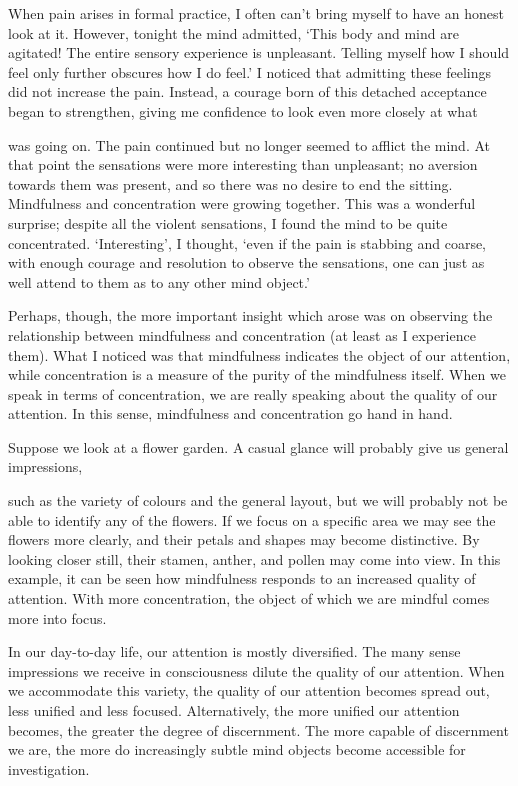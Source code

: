 When pain arises in formal practice, I often can't bring myself to have
an honest look at it. However, tonight the mind admitted, `This body and
mind are agitated! The entire sensory experience is unpleasant. Telling
myself how I should feel only further obscures how I do feel.' I noticed
that admitting these feelings did not increase the pain. Instead, a
courage born of this detached acceptance began to strengthen, giving me
confidence to look even more closely at what

was going on. The pain continued but no longer seemed to afflict the
mind. At that point the sensations were more interesting than
unpleasant; no aversion towards them was present, and so there was no
desire to end the sitting. Mindfulness and concentration were growing
together. This was a wonderful surprise; despite all the violent
sensations, I found the mind to be quite concentrated. `Interesting', I
thought, `even if the pain is stabbing and coarse, with enough courage
and resolution to observe the sensations, one can just as well attend to
them as to any other mind object.'

Perhaps, though, the more important insight which arose was on observing
the relationship between mindfulness and concentration (at least as I
experience them). What I noticed was that mindfulness indicates the
object of our attention, while concentration is a measure of the purity
of the mindfulness itself. When we speak in terms of concentration, we
are really speaking about the quality of our attention. In this sense, 
mindfulness and concentration go hand in hand. 

Suppose we look at a flower garden. A casual glance will probably give
us general impressions, 

such as the variety of colours and the general layout, but we will
probably not be able to identify any of the flowers. If we focus on a
specific area we may see the flowers more clearly, and their petals and
shapes may become distinctive. By looking closer still, their stamen, 
anther, and pollen may come into view. In this example, it can be seen
how mindfulness responds to an increased quality of attention. With more
concentration, the object of which we are mindful comes more into focus. 

In our day-to-day life, our attention is mostly diversified. The many
sense impressions we receive in consciousness dilute the quality of our
attention. When we accommodate this variety, the quality of our
attention becomes spread out, less unified and less focused. 
Alternatively, the more unified our attention becomes, the greater the
degree of discernment. The more capable of discernment we are, the more
do increasingly subtle mind objects become accessible for investigation. 

